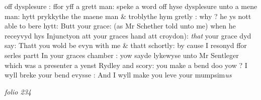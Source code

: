 \documentclass[12pt, a4paper]{book}
\begin{document}
                     off 
			dysplesure : ffor yff a grett man: speke a word off hyse dysplesure unto a mene man: hytt prykkythe the maene man \& troblythe hym 
			 gretly : why ? he ys nott able to bere hytt: Butt your grace: (as Mr Schether told unto me) when he receyvyd hys Injunctyon att your graces hand att croydon): \textit{that }your grace dyd say: Thatt you wold be evyn with me \& thatt schortly: by cause I resonyd ffor serles partt In your graces 
				\marginpar[\vspace{0.5cm}{\textcolor{Gray}{Sentleger}}]{}
			 chamber : yow sayde lykewyse 
			unto Mr Sentleger which was a presenter a yenst Rydley and scory: you make a bend doo yow ? I wyll breke your bend evysse : And I wyll make you leve your mumpsim\textit{us}
                     
                  
               
               
\dotfill
					

\textit{folio 234}
\end{document}
